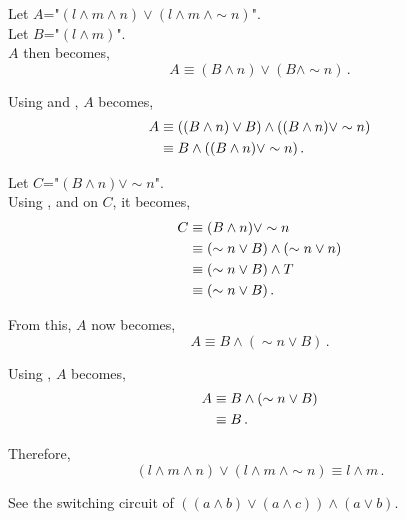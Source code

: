 \begin{subquestions}
Let $A$="$(l \land m \land n) \lor (l \land m ~\land \sim n)$". \\
Let $B$="$(l \land m)$". \\
$A$ then becomes,
\begin{equation}
	A \equiv (B \land n) \lor (B \land \sim n) \,.
\end{equation}

Using  and , $A$ becomes,
\begin{align}
	A & \equiv ((B \land n) \lor B) \land ((B \land n) \lor \sim n) \nn \\
	  & \equiv B \land ((B \land n) \lor \sim n) \,.
\end{align}

Let $C$="$(B \land n) \lor \sim n$". \\
Using ,  and  on $C$, it becomes,
\begin{align}
	C & \equiv (B \land n) \lor \sim n \nn \\
	  & \equiv (\sim n \lor B) \land (\sim n \lor n) \nn \\
	  & \equiv (\sim n \lor B) \land T \nn \\
	  & \equiv (\sim n \lor B) \,.
\end{align}

From this, $A$ now becomes,
\begin{equation}
	A \equiv B \land (\sim n \lor B) \,.
\end{equation}

Using , $A$ becomes,
\begin{align}
	A & \equiv B \land (\sim n \lor B) \nn \\
	  & \equiv B \,.
\end{align}

Therefore,
\begin{equation}
	(l \land m \land n) \lor (l \land m ~\land \sim n) \equiv l \land m \,.
\end{equation}


\subquestion

See the switching circuit of $((a \land b) \lor (a \land c)) \land (a \lor b)$.
\begin{center}
	\begin{circuitikz}
		

\end{circuitikz}
\end{center}
\end{subquestions}

